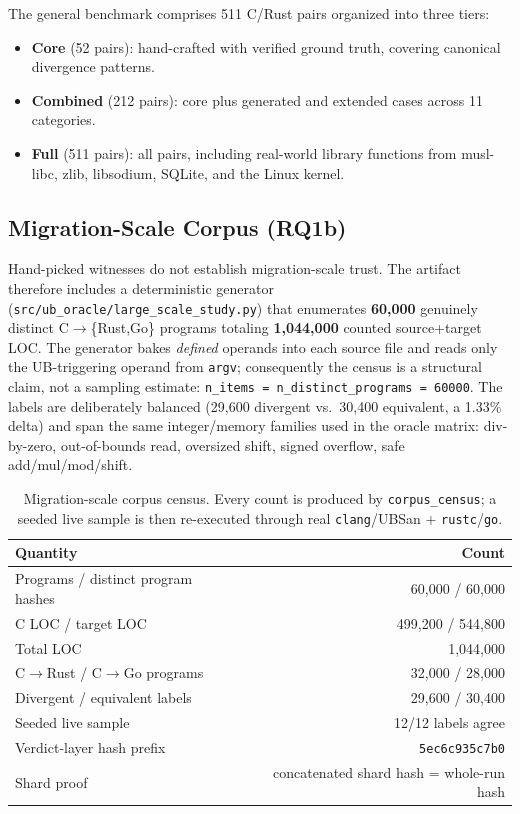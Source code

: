 \documentclass[10pt,a4paper]{article}
\begin{document}
The general benchmark comprises 511 C/Rust pairs organized into three tiers:
\begin{itemize}[nosep]
  \item \textbf{Core} (52 pairs): hand-crafted with verified ground
    truth, covering canonical divergence patterns.
  \item \textbf{Combined} (212 pairs): core plus generated and
    extended cases across 11 categories.
  \item \textbf{Full} (511 pairs): all pairs, including real-world
    library functions from musl-libc, zlib, libsodium, SQLite, and
    the Linux kernel.
\end{itemize}

\subsection{Migration-Scale Corpus (RQ1b)}\label{sec:eval-large-scale}

Hand-picked witnesses do not establish migration-scale trust.  The artifact
therefore includes a deterministic generator
(\texttt{src/ub\_oracle/large\_scale\_study.py}) that enumerates
\textbf{60{,}000} genuinely distinct C$\to$\{Rust,Go\} programs totaling
\textbf{1{,}044{,}000} counted source+target LOC.  The generator bakes
\emph{defined} operands into each source file and reads only the
UB-triggering operand from \texttt{argv}; consequently the census is a structural
claim, not a sampling estimate: \texttt{n\_items =
n\_distinct\_programs = 60000}.  The labels are deliberately balanced
(29{,}600 divergent vs.\ 30{,}400 equivalent, a 1.33\% delta) and span the same
integer/memory families used in the oracle matrix: div-by-zero, out-of-bounds
read, oversized shift, signed overflow, safe add/mul/mod/shift.

\begin{table}[t]
\centering
\small
\caption{Migration-scale corpus census. Every count is produced by
\texttt{corpus\_census}; a seeded live sample is then re-executed through real
\texttt{clang}/UBSan + \texttt{rustc}/\texttt{go}.}
\label{tab:large-scale}
\begin{tabular}{@{}lr@{}}
\toprule
Quantity & Count \\
\midrule
Programs / distinct program hashes & 60{,}000 / 60{,}000 \\
C LOC / target LOC & 499{,}200 / 544{,}800 \\
Total LOC & 1{,}044{,}000 \\
C$\to$Rust / C$\to$Go programs & 32{,}000 / 28{,}000 \\
Divergent / equivalent labels & 29{,}600 / 30{,}400 \\
Seeded live sample & 12/12 labels agree \\
Verdict-layer hash prefix & \texttt{5ec6c935c7b0} \\
Shard proof & concatenated shard hash = whole-run hash \\
\bottomrule
\end{tabular}
\end{table}
\end{document}
